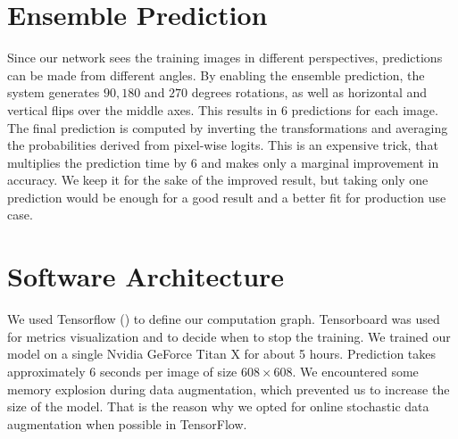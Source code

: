 \documentclass[10pt,conference,compsocconf]{IEEEtran}
\begin{document}
\section{Ensemble Prediction}\label{sec:ensemble}
Since our network sees the training images in different perspectives, predictions can be made from different angles. By enabling the ensemble prediction, the system generates $90, 180$ and $270$ degrees rotations, as well as horizontal and vertical flips over the middle axes. This results in 6 predictions for each image. The final prediction is computed by inverting the transformations and averaging the probabilities derived from pixel-wise logits. This is an expensive trick, that multiplies the prediction time by 6 and makes only a marginal improvement in accuracy. We keep it for the sake of the improved result, but taking only one prediction would be enough for a good result and a better fit for production use case.

\section{Software Architecture}\label{sec:implementation}
We used Tensorflow (\citealt{tensorflow2015-whitepaper}) to define our computation graph. Tensorboard was used for metrics visualization and to decide when to stop the training. We trained our model on a single Nvidia GeForce Titan X for about 5 hours. Prediction takes approximately 6 seconds per image of size $608\times608$. We encountered some memory explosion during data augmentation, which prevented us to increase the size of the model. That is the reason why we opted for online stochastic data augmentation when possible in TensorFlow.
\end{document}
